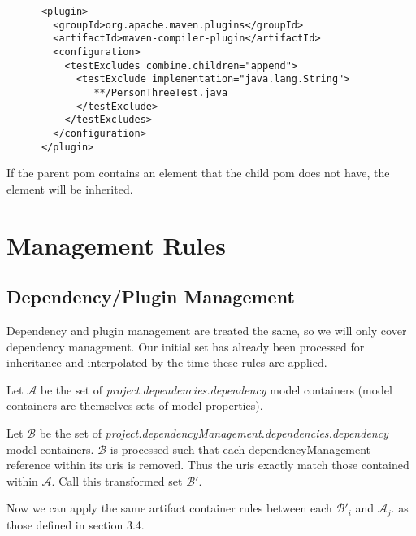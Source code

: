\documentclass[12pt]{amsart}
\begin{document}
\begin{verbatim}
      <plugin>
        <groupId>org.apache.maven.plugins</groupId>
        <artifactId>maven-compiler-plugin</artifactId>
        <configuration>
          <testExcludes combine.children="append">
            <testExclude implementation="java.lang.String">
               **/PersonThreeTest.java
            </testExclude>
          </testExcludes>
        </configuration>
      </plugin>
\end{verbatim}

If the parent pom contains an element that the child pom does not have, the element will be inherited.



\section{Management Rules}
\subsection{Dependency/Plugin Management}
Dependency and plugin management are treated the same, so we will only cover dependency management. Our initial set has already been processed for inheritance and interpolated by the time these rules are applied. 

Let \begin{math}\mathcal{A}\end{math} be the set of \emph{project.dependencies.dependency} model containers (model containers are themselves sets of model properties). 

Let \begin{math}\mathcal{B}\end{math} be the set of 
\emph{project.dependencyManagement.dependencies.dependency }model containers. \begin{math}\mathcal{B}\end{math} is processed such that each dependencyManagement reference within its uris is removed. Thus the uris exactly match those contained within \begin{math}\mathcal{A}\end{math}. Call this transformed set \begin{math} \mathcal{B'}\end{math}. 

Now we can apply the same artifact container rules between each  \begin{math} \mathcal{B'}_{i} \end{math} and  \begin{math} \mathcal{A}_{j}\end{math}.  as those defined in section 3.4.
\end{document}
